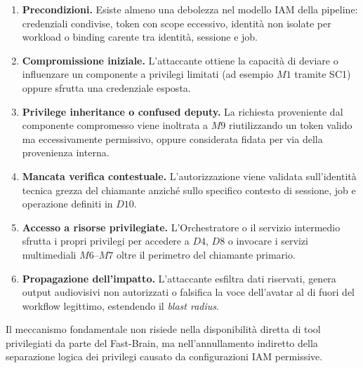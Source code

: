 \documentclass[11pt,a4paper]{article}
\begin{document}
\begin{enumerate}
    \item \textbf{Precondizioni.} Esiste almeno una debolezza nel modello IAM della pipeline: credenziali condivise, token con scope eccessivo, identità non isolate per workload o binding carente tra identità, sessione e job.

    \item \textbf{Compromissione iniziale.} L'attaccante ottiene la capacità di deviare o influenzare un componente a privilegi limitati (ad esempio $M1$ tramite SC1) oppure sfrutta una credenziale esposta.

    \item \textbf{Privilege inheritance o confused deputy.} La richiesta proveniente dal componente compromesso viene inoltrata a $M9$ riutilizzando un token valido ma eccessivamente permissivo, oppure considerata fidata per via della provenienza interna.

    \item \textbf{Mancata verifica contestuale.} L'autorizzazione viene validata sull'identità tecnica grezza del chiamante anziché sullo specifico contesto di sessione, job e operazione definiti in $D10$.

    \item \textbf{Accesso a risorse privilegiate.} L'Orchestratore o il servizio intermedio sfrutta i propri privilegi per accedere a $D4$, $D8$ o invocare i servizi multimediali $M6$--$M7$ oltre il perimetro del chiamante primario.

    \item \textbf{Propagazione dell'impatto.} L'attaccante esfiltra dati riservati, genera output audiovisivi non autorizzati o falsifica la voce dell'avatar al di fuori del workflow legittimo, estendendo il \emph{blast radius}.
\end{enumerate}

Il meccanismo fondamentale non risiede nella disponibilità diretta di tool privilegiati da parte del Fast-Brain, ma nell'annullamento indiretto della separazione logica dei privilegi causato da configurazioni IAM permissive.
\end{document}
